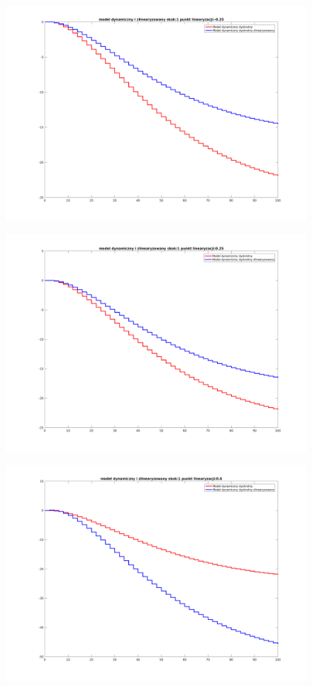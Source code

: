 \documentclass[a4paper, 11pt]{article}
\begin{document}
\begin{figure}[H]
\centering
\includegraphics[scale=0.45]{91m25.png}
\end{figure}
\begin{figure}[H]
\centering
\includegraphics[scale=0.45]{9125.png}
\end{figure}
\begin{figure}[H]
\centering
\includegraphics[scale=0.45]{916.png}
\end{figure}
\end{document}
